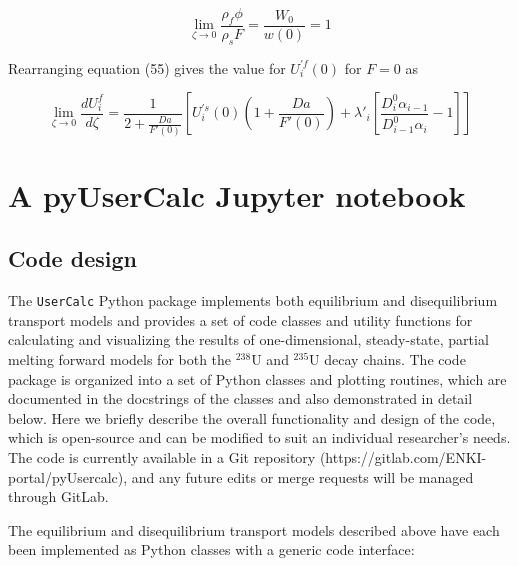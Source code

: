\documentclass[draft]{agujournal2019}
\begin{document}
\begin{linenomath*}
\begin{equation}
    \lim_{\zeta \rightarrow 0}  \frac{\rho_f \phi}{\rho_s F} = \frac{W_0}{w(0)} = 1\label{eq:59}
\end{equation}
\end{linenomath*}

Rearranging equation (55) gives the value for $U_i^{'f}(0)$ for $F=0$ as

\begin{linenomath*}
\begin{equation}
    \lim_{\zeta \rightarrow 0} \frac{dU_i^f}{d\zeta} = \frac{1}{2 + \frac{Da}{F'(0)}}\left[U_i^{'s}(0)\left(1 + \frac{Da}{F'(0)}\right) +\lambda'_i \left[\frac{D_i^0 \alpha_{i-1}}{D_{i-1}^0 \alpha_i} - 1\right] \right]\label{eq:60}
\end{equation}
\end{linenomath*}


\section{A pyUserCalc Jupyter notebook}

\subsection{Code design}

The \colorbox{gray!20}{\texttt{UserCalc}} Python package implements both equilibrium and disequilibrium transport models and provides a set of code classes and utility functions for calculating and visualizing the results of one-dimensional, steady-state, partial melting forward models for both the $^{238}$U and $^{235}$U decay chains. The code package is organized into a set of Python classes and plotting routines, which are documented in the docstrings of the classes and also demonstrated in detail below. Here we briefly describe the overall functionality and design of the code, which is open-source and can be modified to suit an individual researcher's needs. The code is currently available in a Git repository (https://gitlab.com/ENKI-portal/pyUsercalc), and any future edits or merge requests will be managed through GitLab.

The equilibrium and disequilibrium transport models described above have each been implemented as Python classes with a generic code interface:
\end{document}
